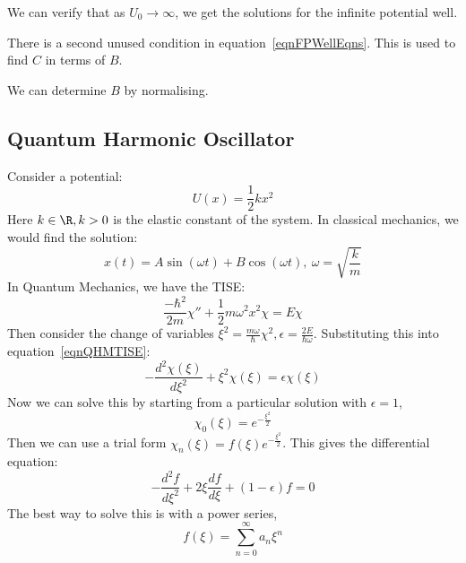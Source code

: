 \documentclass[../Main.tex]{subfiles}
\begin{document}
\begin{remarks}
    \item We can verify that as $U_0 \to \infty$, we get the solutions for the infinite potential well.
    \item There is a second unused condition in equation~\ref{eqnFPWellEqns}. This is used to find $C$ in terms of $B$.
    \item We can determine $B$ by normalising.
\end{remarks}
\subsection{Quantum Harmonic Oscillator}
Consider a potential:
\begin{equation*}
    U(x) = \frac12 k x^2
\end{equation*}
Here $k \in \R, k > 0$ is the elastic constant of the system.
In classical mechanics, we would find the solution:
\begin{equation*}
    x(t) = A\sin(\omega t) + B\cos(\omega t),~\omega = \sqrt{\frac{k}{m}}
\end{equation*}
In Quantum Mechanics, we have the TISE:
\begin{equation}
    \frac{-\hbar^2}{2m}\chi'' + \frac{1}{2}m\omega^2 x^2 \chi = E\chi
    \label{eqnQHMTISE}
\end{equation}
Then consider the change of variables $\xi^2 = \frac{m\omega}{\hbar}\chi^2, \epsilon = \frac{2E}{\hbar \omega}$. Substituting this into equation~\ref{eqnQHMTISE}:
\begin{equation}
    -\frac{d^{2}\chi(\xi)}{d\xi^{2}} + \xi^2 \chi(\xi) = \epsilon\chi(\xi)
    \label{eqnQHMScaledTISE}
\end{equation}
Now we can solve this by starting from a particular solution with $\epsilon = 1$,
\begin{equation}
    \chi_0(\xi) = e^{-\frac{\xi^2}{2}}
    \label{eqnQHMPartSoln}
\end{equation}
Then we can use a trial form $\chi_n(\xi) = f(\xi) e^{-\frac{\xi^2}{2}}$. This gives the differential equation:
\begin{equation}
    -\frac{d^{2}f}{d\xi^{2}} + 2\xi \frac{df}{d\xi} + (1 - \epsilon)f = 0
    \label{eqnQHMTrialEquation}
\end{equation}
The best way to solve this is with a power series,
\begin{equation*}
    f(\xi) = \sum_{n=0}^{\infty} a_n \xi^n
\end{equation*}
\end{document}
